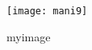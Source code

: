 \documentclass{article}
\begin{document}
\begin{figure}
	\centering
	\texttt{[image: mani9]}
	\caption{myimage}
	\label{fig:mani9}
\end{figure}
\end{document}
